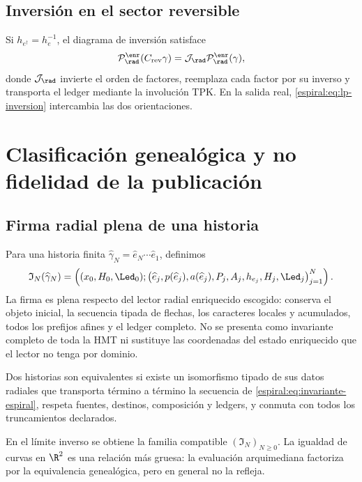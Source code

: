 \section{Inversión en el sector reversible}

Si \(h_{e^\dagger}=h_e^{-1}\), el diagrama de inversión satisface
\[
 \mathcal P_{\rad}^{\enr}(C_{\mathrm{rev}}\gamma)
 =\mathcal J_{\rad}
 \mathcal P_{\rad}^{\enr}(\gamma),
\]
donde \(\mathcal J_{\rad}\) invierte el orden de factores, reemplaza cada
factor por su inverso y transporta el ledger mediante la involución TPK. En
la salida real, \cref{espiral:eq:lp-inversion} intercambia las dos orientaciones.

\chapter{Clasificación genealógica y no fidelidad de la publicación}

\section{Firma radial plena de una historia}

Para una historia finita
\(\widehat\gamma_N=\widehat e_N\cdots\widehat e_1\), definimos
\begin{equation}
 \mathfrak I_N(\widehat\gamma_N)=
 \left(
 (x_0,H_0,\Led_0);
 \bigl(\widehat e_j,p(\widehat e_j),a(\widehat e_j),P_j,A_j,
 h_{e_j},H_j,\Led_j\bigr)_{j=1}^{N}
 \right).
 \label{espiral:eq:invariante-espiral}
\end{equation}
La firma es plena respecto del lector radial enriquecido escogido: conserva
el objeto inicial, la secuencia tipada de flechas, los caracteres locales y
acumulados, todos los prefijos afines y el ledger completo. No se presenta
como invariante completo de toda la HMT ni sustituye las coordenadas del
estado enriquecido que el lector no tenga por dominio.

\begin{definition}
Dos historias son equivalentes si existe un isomorfismo tipado de sus datos
radiales que transporta término a término la secuencia de
\cref{espiral:eq:invariante-espiral}, respeta fuentes, destinos, composición y
ledgers, y conmuta con todos los truncamientos declarados.
\end{definition}

En el límite inverso se obtiene la familia compatible
\((\mathfrak I_N)_{N\ge0}\). La igualdad de curvas en \(\R^2\) es una
relación más gruesa: la evaluación arquimediana factoriza por la equivalencia
genealógica, pero en general no la refleja.

